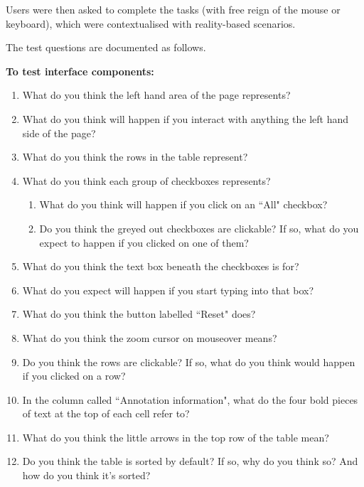 Users were then asked to complete the tasks (with free reign of the mouse or keyboard), which were contextualised with reality-based scenarios.

The test questions are documented as follows.

\textbf{To test interface components:}
\begin{enumerate}
 \item What do you think the left hand area of the page represents?
 \item What do you think will happen if you interact with anything the left hand side of the page?
  \item What do you think the rows in the table represent?
  \item What do you think each group of checkboxes represents? 
   \begin{enumerate}
    \item What do you think will happen if you click on an ``All" checkbox?
    \item Do you think the greyed out checkboxes are clickable? If so, what do you expect to happen if you clicked on one of them?
   \end{enumerate}
  \item What do you think the text box beneath the checkboxes is for?
  \item What do you expect will happen if you start typing into that box?
  \item What do you think the button labelled ``Reset" does?
  \item What do you think the zoom cursor on mouseover means?
  \item Do you think the rows are clickable? If so, what do you think would happen if you clicked on a row?
  \item In the column called ``Annotation information", what do the four bold pieces of text at the top of each cell refer to?
  \item What do you think the little arrows in the top row of the table mean?
  \item Do you think the table is sorted by default? If so, why do you think so? And how do you think it's sorted? 
\end{enumerate}

